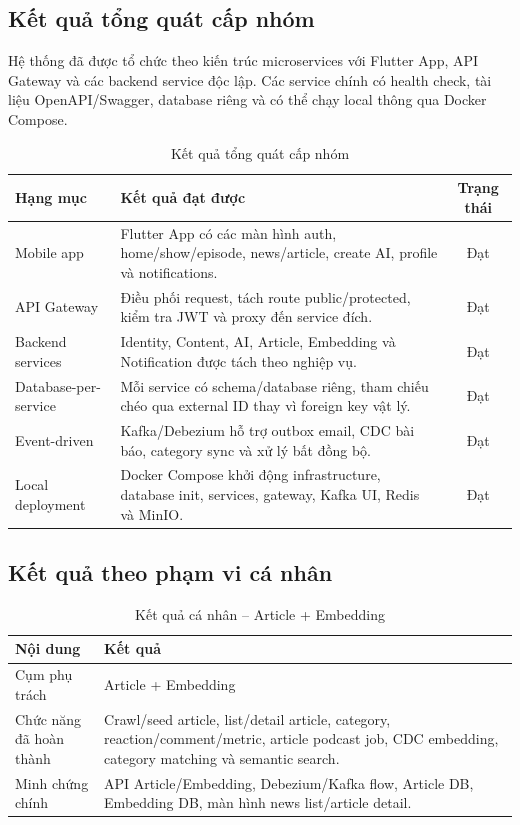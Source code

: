 \documentclass[14pt,a4paper,oneside]{extreport}
\begin{document}
\subsection{Kết quả tổng quát cấp nhóm}

Hệ thống đã được tổ chức theo kiến trúc microservices với Flutter App, API Gateway và các backend service độc lập. Các service chính có health check, tài liệu OpenAPI/Swagger, database riêng và có thể chạy local thông qua Docker Compose.

\begin{table}[H]
\centering
\caption{Kết quả tổng quát cấp nhóm}
\label{tab:ket-qua-tong-quat}
\renewcommand{\arraystretch}{1.3}
\small
\begin{tabularx}{\textwidth}{|l|X|c|}
\hline
\textbf{Hạng mục} & \textbf{Kết quả đạt được} & \textbf{Trạng thái} \\
\hline
Mobile app & Flutter App có các màn hình auth, home/show/episode, news/article, create AI, profile và notifications. & Đạt \\
\hline
API Gateway & Điều phối request, tách route public/protected, kiểm tra JWT và proxy đến service đích. & Đạt \\
\hline
Backend services & Identity, Content, AI, Article, Embedding và Notification được tách theo nghiệp vụ. & Đạt \\
\hline
Database-per-service & Mỗi service có schema/database riêng, tham chiếu chéo qua external ID thay vì foreign key vật lý. & Đạt \\
\hline
Event-driven & Kafka/Debezium hỗ trợ outbox email, CDC bài báo, category sync và xử lý bất đồng bộ. & Đạt \\
\hline
Local deployment & Docker Compose khởi động infrastructure, database init, services, gateway, Kafka UI, Redis và MinIO. & Đạt \\
\hline
\end{tabularx}
\end{table}

\subsection{Kết quả theo phạm vi cá nhân}

\begin{table}[H]
\centering
\caption{Kết quả cá nhân -- Article + Embedding}
\label{tab:ket-qua-ca-nhan}
\renewcommand{\arraystretch}{1.3}
\small
\begin{tabularx}{\textwidth}{|l|X|}
\hline
\textbf{Nội dung} & \textbf{Kết quả} \\
\hline
Cụm phụ trách & Article + Embedding \\
\hline
Chức năng đã hoàn thành & Crawl/seed article, list/detail article, category, reaction/comment/metric, article podcast job, CDC embedding, category matching và semantic search. \\
\hline
Minh chứng chính & API Article/Embedding, Debezium/Kafka flow, Article DB, Embedding DB, màn hình news list/article detail. \\
\hline
\end{tabularx}
\end{table}
\end{document}
